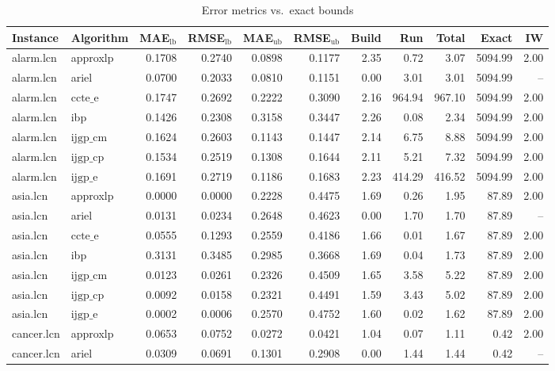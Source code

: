 \begin{table}[ht]
\centering
\scriptsize
\caption{Error metrics vs.\ exact bounds}
\begin{tabular}{llrrrrrrrrr}
\toprule
Instance & Algorithm & MAE$_{\text{lb}}$ & RMSE$_{\text{lb}}$ & MAE$_{\text{ub}}$ & RMSE$_{\text{ub}}$ & Build & Run & Total & Exact & IW \\
\midrule
alarm.lcn & approxlp & 0.1708 & 0.2740 & 0.0898 & 0.1177 & 2.35 & 0.72 & 3.07 & 5094.99 & 2.00 \\
alarm.lcn & ariel & 0.0700 & 0.2033 & 0.0810 & 0.1151 & 0.00 & 3.01 & 3.01 & 5094.99 & -- \\
alarm.lcn & $\text{ccte\_e}$ & 0.1747 & 0.2692 & 0.2222 & 0.3090 & 2.16 & 964.94 & 967.10 & 5094.99 & 2.00 \\
alarm.lcn & ibp & 0.1426 & 0.2308 & 0.3158 & 0.3447 & 2.26 & 0.08 & 2.34 & 5094.99 & 2.00 \\
alarm.lcn & $\text{ijgp\_cm}$ & 0.1624 & 0.2603 & 0.1143 & 0.1447 & 2.14 & 6.75 & 8.88 & 5094.99 & 2.00 \\
alarm.lcn & $\text{ijgp\_cp}$ & 0.1534 & 0.2519 & 0.1308 & 0.1644 & 2.11 & 5.21 & 7.32 & 5094.99 & 2.00 \\
alarm.lcn & $\text{ijgp\_e}$ & 0.1691 & 0.2719 & 0.1186 & 0.1683 & 2.23 & 414.29 & 416.52 & 5094.99 & 2.00 \\
asia.lcn & approxlp & 0.0000 & 0.0000 & 0.2228 & 0.4475 & 1.69 & 0.26 & 1.95 & 87.89 & 2.00 \\
asia.lcn & ariel & 0.0131 & 0.0234 & 0.2648 & 0.4623 & 0.00 & 1.70 & 1.70 & 87.89 & -- \\
asia.lcn & $\text{ccte\_e}$ & 0.0555 & 0.1293 & 0.2559 & 0.4186 & 1.66 & 0.01 & 1.67 & 87.89 & 2.00 \\
asia.lcn & ibp & 0.3131 & 0.3485 & 0.2985 & 0.3668 & 1.69 & 0.04 & 1.73 & 87.89 & 2.00 \\
asia.lcn & $\text{ijgp\_cm}$ & 0.0123 & 0.0261 & 0.2326 & 0.4509 & 1.65 & 3.58 & 5.22 & 87.89 & 2.00 \\
asia.lcn & $\text{ijgp\_cp}$ & 0.0092 & 0.0158 & 0.2321 & 0.4491 & 1.59 & 3.43 & 5.02 & 87.89 & 2.00 \\
asia.lcn & $\text{ijgp\_e}$ & 0.0002 & 0.0006 & 0.2570 & 0.4752 & 1.60 & 0.02 & 1.62 & 87.89 & 2.00 \\
cancer.lcn & approxlp & 0.0653 & 0.0752 & 0.0272 & 0.0421 & 1.04 & 0.07 & 1.11 & 0.42 & 2.00 \\
cancer.lcn & ariel & 0.0309 & 0.0691 & 0.1301 & 0.2908 & 0.00 & 1.44 & 1.44 & 0.42 & -- \\

\end{tabular}
\end{table}

